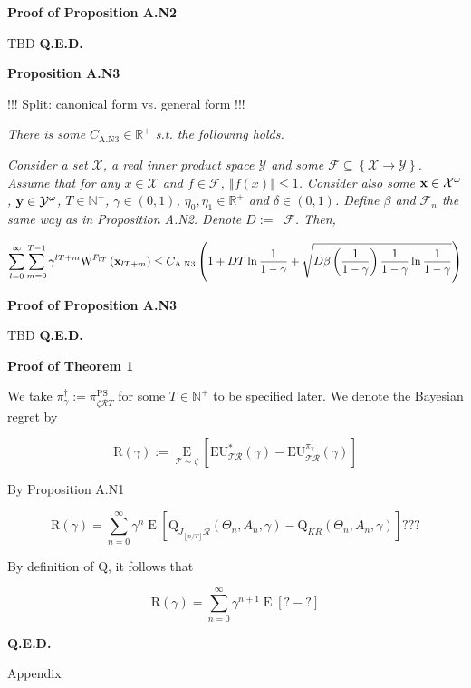 \documentclass[a4paper]{article}
\newcommand{\Co}[1]{}
\newcommand{\AP}[1]{\left(#1\right)}
\newcommand{\AB}[1]{\left[#1\right]}
\newcommand{\AC}[1]{\left\{#1\right\}}
\newcommand{\Ea}[2]{\underset{#1}{\operatorname{E}}\AB{#2}}
\newcommand{\Nats}{\mathbb{N}}
\newcommand{\Reals}{\mathbb{R}}
\newcommand{\Norm}[1]{\left\Vert #1 \right\Vert}
\newcommand{\Floor}[1]{\left\lfloor #1 \right\rfloor}
\newcommand{\X}{\mathcal{X}}
\newcommand{\Y}{\mathcal{Y}}
\newcommand{\F}{\mathcal{F}}
\newcommand{\R}{\mathcal{R}}
\newcommand{\T}{\mathcal{T}}
\DeclareMathOperator{\RVO}{\dim_{RVO}}
\newcommand{\Q}{\mathrm{Q}}
\newcommand{\EU}{\mathrm{EU}}
\newcommand{\Reg}{\mathrm{R}}
\newcommand{\PSR}{\text{PS}}
\newcommand{\W}{\mathrm{W}}
\begin{document}
\textbf{Proof of Proposition A.N2}\Co{b}

TBD \textbf{Q.E.D.}\Co{b}

\textbf{Proposition A.N3}\Co{b}

!!! Split: canonical form vs. general form !!!

\textit{There is some $C_{\mathrm{A.N3}}\in\Reals^+$ s.t. the following holds.}\Co{i}

\textit{Consider a set $\X$, a real inner product space $\Y$ and some $\F\subseteq\AC{\X\rightarrow\Y}$. Assume that for any $x\in\X$ and $f\in\F$, $\Norm{f(x)}\leq 1$. Consider also some $\bold{x}\in\X^\omega$, $\bold{y}\in\Y^\omega$, $T\in\Nats^+$, $\gamma\in(0,1)$, $\eta_0,\eta_1\in\Reals^+$ and $\delta\in(0,1)$. Define $\beta$ and $\F_n$ the same way as in Proposition A.N2. Denote $D:=\RVO{\F}$. Then,}\Co{i}

$$\sum_{l=0}^\infty\sum_{m=0}^{T-1}{\gamma^{lT+m}\W^{F_{lT}}\AP{\bold{x}_{lT+m}}} \leq C_{\mathrm{A.N3}}\AP{1+D T\ln\frac{1}{1-\gamma}+\sqrt{D\beta\AP{\frac{1}{1-\gamma}}\frac{1}{1-\gamma}\ln{\frac{1}{1-\gamma}}}}$$

\textbf{Proof of Proposition A.N3}\Co{b}

TBD \textbf{Q.E.D.}\Co{b}

\textbf{Proof of Theorem 1}\Co{b}

We take $\pi^\dagger_\gamma:=\pi^\PSR_{\zeta\R T}$ for some $T\in\Nats^+$ to be specified later. We denote the Bayesian regret by

$$\Reg(\gamma):=\Ea{\T\sim\zeta}{\EU^*_{\T\R}(\gamma)-\EU^{\pi_{\gamma}^{\dagger}}_{\T\R}(\gamma)}$$

By Proposition A.N1

$$\Reg(\gamma)=\sum_{n=0}^\infty\gamma^{n}\Ea{}{\Q_{J_{\Floor{n/T}}\R}\AP{\Theta_n,A_n,\gamma}-\Q_{KR}\AP{\Theta_n,A_n,\gamma}}???$$

By definition of $\Q$, it follows that

$$\Reg(\gamma)=\sum_{n=0}^\infty\gamma^{n+1}\Ea{}{?-?}$$


 
 


\textbf{Q.E.D.}\Co{b}

\begin{Huge}Appendix\end{Huge}
\end{document}
